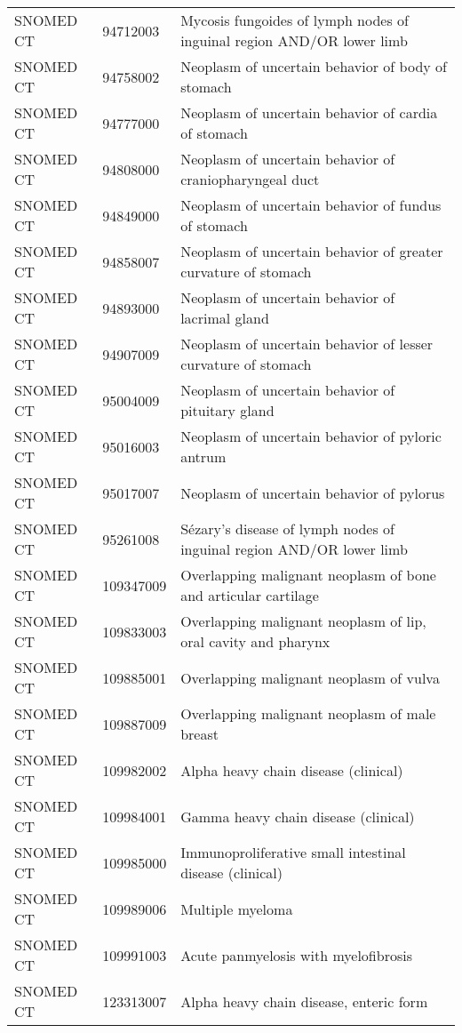 \begin{longtable}{p{}p{}p{}}
  SNOMED CT & 94712003 & Mycosis fungoides of lymph nodes of inguinal region AND/OR lower limb \\ 
  SNOMED CT & 94758002 & Neoplasm of uncertain behavior of body of stomach \\ 
  SNOMED CT & 94777000 & Neoplasm of uncertain behavior of cardia of stomach \\ 
  SNOMED CT & 94808000 & Neoplasm of uncertain behavior of craniopharyngeal duct \\ 
  SNOMED CT & 94849000 & Neoplasm of uncertain behavior of fundus of stomach \\ 
  SNOMED CT & 94858007 & Neoplasm of uncertain behavior of greater curvature of stomach \\ 
  SNOMED CT & 94893000 & Neoplasm of uncertain behavior of lacrimal gland \\ 
  SNOMED CT & 94907009 & Neoplasm of uncertain behavior of lesser curvature of stomach \\ 
  SNOMED CT & 95004009 & Neoplasm of uncertain behavior of pituitary gland \\ 
  SNOMED CT & 95016003 & Neoplasm of uncertain behavior of pyloric antrum \\ 
  SNOMED CT & 95017007 & Neoplasm of uncertain behavior of pylorus \\ 
  SNOMED CT & 95261008 & Sézary's disease of lymph nodes of inguinal region AND/OR lower limb \\ 
  SNOMED CT & 109347009 & Overlapping malignant neoplasm of bone and articular cartilage \\ 
  SNOMED CT & 109833003 & Overlapping malignant neoplasm of lip, oral cavity and pharynx \\ 
  SNOMED CT & 109885001 & Overlapping malignant neoplasm of vulva \\ 
  SNOMED CT & 109887009 & Overlapping malignant neoplasm of male breast \\ 
  SNOMED CT & 109982002 & Alpha heavy chain disease (clinical) \\ 
  SNOMED CT & 109984001 & Gamma heavy chain disease (clinical) \\ 
  SNOMED CT & 109985000 & Immunoproliferative small intestinal disease (clinical) \\ 
  SNOMED CT & 109989006 & Multiple myeloma \\ 
  SNOMED CT & 109991003 & Acute panmyelosis with myelofibrosis \\ 
  SNOMED CT & 123313007 & Alpha heavy chain disease, enteric form \\ 

\end{longtable}
